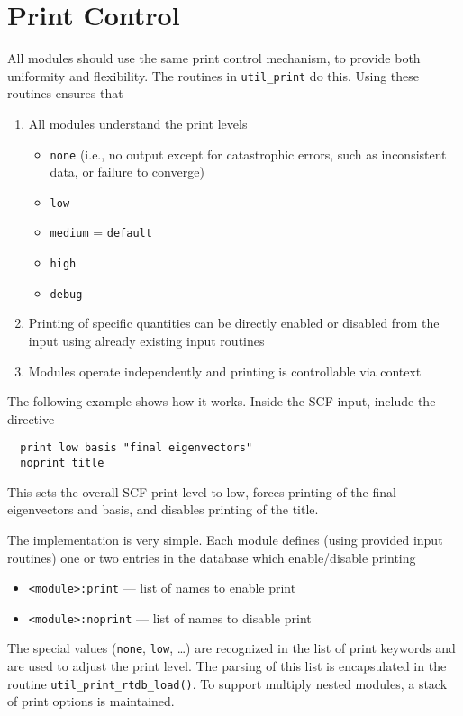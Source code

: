\section{Print Control}
\label{sec:print}

All modules should use the same print control mechanism, to provide
both uniformity and flexibility.  The routines in \verb+util_print+ do
this.  Using these routines ensures that

\begin{enumerate}
\item All modules understand the print levels
\begin{itemize}
\item \verb+none+ (i.e., no output except for catastrophic errors, such as 
inconsistent data, or failure to converge)
\item \verb+low+
\item \verb+medium+ = \verb+default+
\item \verb+high+
\item \verb+debug+
\end{itemize}
\item Printing of specific quantities can be directly enabled or
  disabled from the input using already existing input routines
\item Modules operate independently and printing is
   controllable via context
\end{enumerate}

The following example shows how it works. Inside the SCF input,
 include the directive
\begin{verbatim}
  print low basis "final eigenvectors"
  noprint title
\end{verbatim}
This sets the overall SCF print level to low, forces printing of the
final eigenvectors and basis, and disables printing of the title.

The implementation is very simple.  Each module defines (using
provided input routines) one or two entries in the database which
enable/disable printing

\begin{itemize}
\item \verb+<module>:print+ --- list of names to enable print
\item \verb+<module>:noprint+ --- list of names to disable print
\end{itemize}

The special values ({\tt none}, {\tt low}, \ldots) are recognized in
the list of print keywords and are used to adjust the print level.
The parsing of this list is encapsulated in the routine
\verb+util_print_rtdb_load()+.  To support multiply nested modules, a
stack of print options is maintained.

